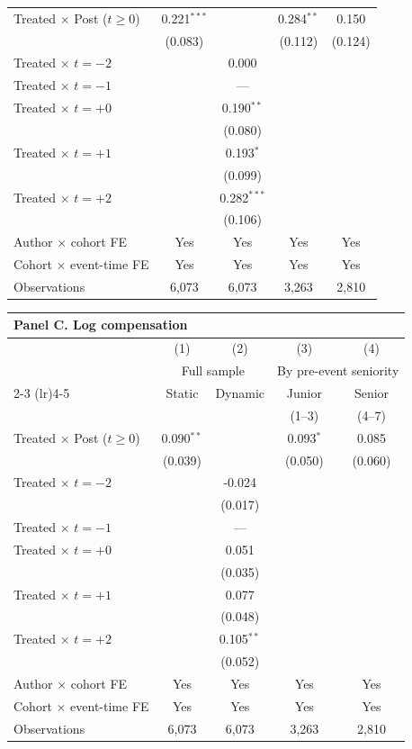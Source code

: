 \begin{center}
\begin{table}
\begin{tabular}{lcccc}
\midrule
\quad Treated $\times$ Post ($t\geq 0$) & 0.221$^{***}$ &  & 0.284$^{**}$ & 0.150 \\
 & (0.083) &  & (0.112) & (0.124) \\
\addlinespace
\quad Treated $\times$ $t=-2$ &  & 0.000 &  &  \\
\quad Treated $\times$ $t=-1$ & & --- & & \\
\quad Treated $\times$ $t=+0$ &  & 0.190$^{**}$ &  &  \\
 &  & (0.080) &  &  \\
\quad Treated $\times$ $t=+1$ &  & 0.193$^{*}$ &  &  \\
 &  & (0.099) &  &  \\
\quad Treated $\times$ $t=+2$ &  & 0.282$^{***}$ &  &  \\
 &  & (0.106) &  &  \\
\midrule
Author $\times$ cohort FE & Yes & Yes & Yes & Yes \\
Cohort $\times$ event-time FE & Yes & Yes & Yes & Yes \\
Observations & 6,073 & 6,073 & 3,263 & 2,810 \\
\bottomrule
\end{tabular}
\end{table}
\begin{table}[t]
\vspace{-9cm}
\begin{tabular}{lcccc}
\multicolumn{5}{l}{\textbf{Panel C. Log compensation}} \\[2pt]
\toprule
 & (1) & (2) & (3) & (4) \\
 & \multicolumn{2}{c}{Full sample} & \multicolumn{2}{c}{By pre-event seniority} \\
\cmidrule(lr){2-3} \cmidrule(lr){4-5}
 & Static & Dynamic & Junior & Senior \\
 & & & \small(1--3) & \small(4--7) \\
\midrule
\quad Treated $\times$ Post ($t\geq 0$) & 0.090$^{**}$ &  & 0.093$^{*}$ & 0.085 \\
 & (0.039) &  & (0.050) & (0.060) \\
\addlinespace
\quad Treated $\times$ $t=-2$ &  & -0.024 &  &  \\
 &  & (0.017) &  &  \\
\quad Treated $\times$ $t=-1$ & & --- & & \\
\quad Treated $\times$ $t=+0$ &  & 0.051 &  &  \\
 &  & (0.035) &  &  \\
\quad Treated $\times$ $t=+1$ &  & 0.077 &  &  \\
 &  & (0.048) &  &  \\
\quad Treated $\times$ $t=+2$ &  & 0.105$^{**}$ &  &  \\
 &  & (0.052) &  &  \\
\midrule
Author $\times$ cohort FE & Yes & Yes & Yes & Yes \\
Cohort $\times$ event-time FE & Yes & Yes & Yes & Yes \\
Observations & 6,073 & 6,073 & 3,263 & 2,810 \\
\bottomrule
\end{tabular}
\end{table}
\end{center}
